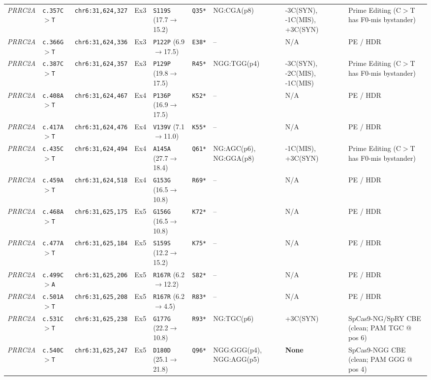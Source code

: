 \documentclass[10pt,letterpaper]{article}
\newcommand{\gene}[1]{\textit{#1}}
\begin{document}
{\begin{longtable}{@{}lllllllll@{}}
\gene{PRRC2A} & \texttt{c.357C$>$T} & \texttt{chr6:31,624,327} & Ex3 & \texttt{S119S} (17.7$\rightarrow$15.2) & \texttt{Q35*} & NG:CGA(p8) & -3C(SYN), -1C(MIS), +3C(SYN) & Prime Editing (C$>$T has F0-mis bystander) \\
\gene{PRRC2A} & \texttt{c.366G$>$T} & \texttt{chr6:31,624,336} & Ex3 & \texttt{P122P} (6.9$\rightarrow$17.5) & \texttt{E38*} & -- & N/A & PE / HDR \\
\gene{PRRC2A} & \texttt{c.387C$>$T} & \texttt{chr6:31,624,357} & Ex3 & \texttt{P129P} (19.8$\rightarrow$17.5) & \texttt{R45*} & NGG:TGG(p4) & -3C(SYN), -2C(MIS), -1C(MIS) & Prime Editing (C$>$T has F0-mis bystander) \\
\gene{PRRC2A} & \texttt{c.408A$>$T} & \texttt{chr6:31,624,467} & Ex4 & \texttt{P136P} (16.9$\rightarrow$17.5) & \texttt{K52*} & -- & N/A & PE / HDR \\
\gene{PRRC2A} & \texttt{c.417A$>$T} & \texttt{chr6:31,624,476} & Ex4 & \texttt{V139V} (7.1$\rightarrow$11.0) & \texttt{K55*} & -- & N/A & PE / HDR \\
\gene{PRRC2A} & \texttt{c.435C$>$T} & \texttt{chr6:31,624,494} & Ex4 & \texttt{A145A} (27.7$\rightarrow$18.4) & \texttt{Q61*} & NG:AGC(p6), NG:GGA(p8) & -1C(MIS), +3C(SYN) & Prime Editing (C$>$T has F0-mis bystander) \\
\gene{PRRC2A} & \texttt{c.459A$>$T} & \texttt{chr6:31,624,518} & Ex4 & \texttt{G153G} (16.5$\rightarrow$10.8) & \texttt{R69*} & -- & N/A & PE / HDR \\
\gene{PRRC2A} & \texttt{c.468A$>$T} & \texttt{chr6:31,625,175} & Ex5 & \texttt{G156G} (16.5$\rightarrow$10.8) & \texttt{K72*} & -- & N/A & PE / HDR \\
\gene{PRRC2A} & \texttt{c.477A$>$T} & \texttt{chr6:31,625,184} & Ex5 & \texttt{S159S} (12.2$\rightarrow$15.2) & \texttt{K75*} & -- & N/A & PE / HDR \\
\gene{PRRC2A} & \texttt{c.499C$>$A} & \texttt{chr6:31,625,206} & Ex5 & \texttt{R167R} (6.2$\rightarrow$12.2) & \texttt{S82*} & -- & N/A & PE / HDR \\
\gene{PRRC2A} & \texttt{c.501A$>$T} & \texttt{chr6:31,625,208} & Ex5 & \texttt{R167R} (6.2$\rightarrow$4.5) & \texttt{R83*} & -- & N/A & PE / HDR \\
\gene{PRRC2A} & \texttt{c.531C$>$T} & \texttt{chr6:31,625,238} & Ex5 & \texttt{G177G} (22.2$\rightarrow$10.8) & \texttt{R93*} & NG:TGC(p6) & +3C(SYN) & SpCas9-NG/SpRY CBE (clean; PAM TGC @ pos 6) \\
\gene{PRRC2A} & \texttt{c.540C$>$T} & \texttt{chr6:31,625,247} & Ex5 & \texttt{D180D} (25.1$\rightarrow$21.8) & \texttt{Q96*} & NGG:GGG(p4), NGG:AGG(p5) & \textbf{None} & SpCas9-NGG CBE (clean; PAM GGG @ pos 4) \\

\end{longtable}}
\end{document}
